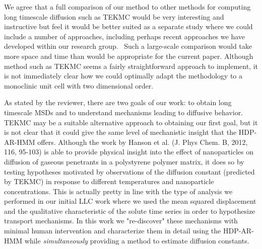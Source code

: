 \documentclass{article}
\begin{document}
\begin{enumerate}[label={Comment \theenumi :}, leftmargin=3.9\parindent]
    We agree that a full comparison of our method to other methods for computing long timescale 
    diffusion such as TEKMC would be very interesting and instructive but feel it would be better 
    suited as a separate study where we could include a number of approaches, including perhaps
    recent approaches we have developed within our research group.~\cite{coscia_capturing_2020}
    Such a large-scale comparison would take more space and time than would be appropriate for the current paper.
    Although method such as TEKMC seems a
    fairly straightforward approach to implement, it is not immediately clear how we could
    optimally adapt the methodology to a monoclinic unit cell with two dimensional order. 
    
    As stated by the reviewer, there are two goals of our work: to obtain long timescale MSDs and
    to understand mechanisms leading to diffusive behavior. TEKMC may be a suitable alternative 
    approach to obtaining our first goal, but it is not clear that it could give the same level
    of mechanistic insight that the HDP-AR-HMM offers. Although the work by Hanson et al.
    (J. Phys Chem. B, 2012, 116, 95-103) is able to provide physical insight into the effect of
    nanoparticles on diffusion of gaseous penetrants in a polystyrene polymer matrix, it does so
    by testing hypotheses motivated by observations of the diffusion constant (predicted by TEKMC)
    in response to different temperatures and nanoparticle concentrations. This is actually pretty
    in line with the type of analysis we performed in our initial LLC work
    where we used the mean squared displacement and the qualitative characteristic of the solute time series in
    order to hypothesize transport mechanisms. In this work we "re-discover" these mechanisms
    with minimal human intervention and characterize them in detail using the HDP-AR-HMM while 
    \textit{simultaneously} providing a method to estimate diffusion constants.
    

\end{enumerate}
\end{document}
